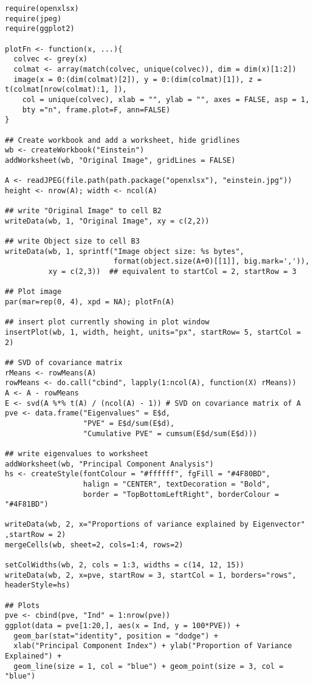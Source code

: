 \documentclass[11pt]{article}\usepackage[]{graphicx}\usepackage[]{color}
\begin{document}
\begin{verbatim}
require(openxlsx)
require(jpeg)
require(ggplot2)

plotFn <- function(x, ...){
  colvec <- grey(x)
  colmat <- array(match(colvec, unique(colvec)), dim = dim(x)[1:2])
  image(x = 0:(dim(colmat)[2]), y = 0:(dim(colmat)[1]), z = t(colmat[nrow(colmat):1, ]),
    col = unique(colvec), xlab = "", ylab = "", axes = FALSE, asp = 1,
    bty ="n", frame.plot=F, ann=FALSE)
}

## Create workbook and add a worksheet, hide gridlines
wb <- createWorkbook("Einstein")
addWorksheet(wb, "Original Image", gridLines = FALSE)

A <- readJPEG(file.path(path.package("openxlsx"), "einstein.jpg"))
height <- nrow(A); width <- ncol(A)

## write "Original Image" to cell B2
writeData(wb, 1, "Original Image", xy = c(2,2))

## write Object size to cell B3
writeData(wb, 1, sprintf("Image object size: %s bytes",
                         format(object.size(A+0)[[1]], big.mark=',')), 
          xy = c(2,3))  ## equivalent to startCol = 2, startRow = 3

## Plot image
par(mar=rep(0, 4), xpd = NA); plotFn(A)

## insert plot currently showing in plot window
insertPlot(wb, 1, width, height, units="px", startRow= 5, startCol = 2)       

## SVD of covariance matrix
rMeans <- rowMeans(A)
rowMeans <- do.call("cbind", lapply(1:ncol(A), function(X) rMeans))
A <- A - rowMeans
E <- svd(A %*% t(A) / (ncol(A) - 1)) # SVD on covariance matrix of A
pve <- data.frame("Eigenvalues" = E$d, 
                  "PVE" = E$d/sum(E$d),
                  "Cumulative PVE" = cumsum(E$d/sum(E$d)))

## write eigenvalues to worksheet
addWorksheet(wb, "Principal Component Analysis")
hs <- createStyle(fontColour = "#ffffff", fgFill = "#4F80BD",
                  halign = "CENTER", textDecoration = "Bold",
                  border = "TopBottomLeftRight", borderColour = "#4F81BD")

writeData(wb, 2, x="Proportions of variance explained by Eigenvector" ,startRow = 2)
mergeCells(wb, sheet=2, cols=1:4, rows=2)

setColWidths(wb, 2, cols = 1:3, widths = c(14, 12, 15))
writeData(wb, 2, x=pve, startRow = 3, startCol = 1, borders="rows", headerStyle=hs)

## Plots
pve <- cbind(pve, "Ind" = 1:nrow(pve))
ggplot(data = pve[1:20,], aes(x = Ind, y = 100*PVE)) +
  geom_bar(stat="identity", position = "dodge") +
  xlab("Principal Component Index") + ylab("Proportion of Variance Explained") +
  geom_line(size = 1, col = "blue") + geom_point(size = 3, col = "blue")


\end{verbatim}
\end{document}
